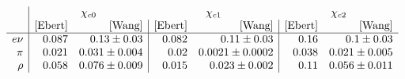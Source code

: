 $$
\begin{array}{r|rr|rr|rr}
  &\multicolumn{2}{c}{\chi_{c0}} & \multicolumn{2}{c}{\chi_{c1}} & \multicolumn{2}{c}{\chi_{c2}} \\
   & \text{[Ebert]} & \text{[Wang]} & \text{[Ebert]} & \text{[Wang]} & \text{[Ebert]} & \text{[Wang]} \\
\hline
 e\nu & 0.087 & 0.13\pm 0.03 & 0.082 & 0.11\pm 0.03 & 0.16 & 0.1\pm 0.03 \\
 \pi & 0.021 & 0.031\pm 0.004 & 0.02 & 0.0021\pm 0.0002 & 0.038 & 0.021\pm 0.005 \\
 \rho & 0.058 & 0.076\pm 0.009 & 0.015 & 0.023\pm 0.002 & 0.11 & 0.056\pm 0.011 \\
\end{array}
$$